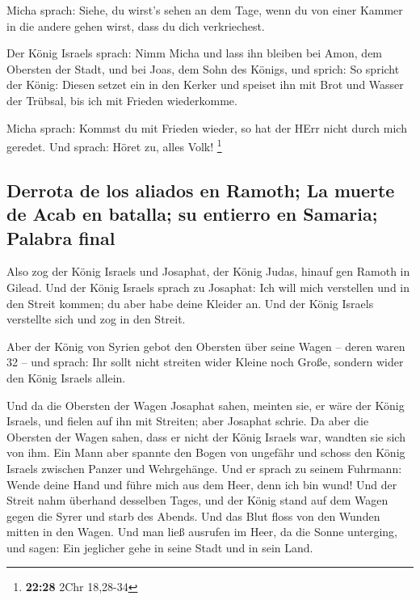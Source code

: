  Micha sprach: Siehe, du wirst's sehen an dem Tage, wenn
du von einer Kammer in die andere gehen wirst, dass du dich
verkriechest.

 Der König Israels sprach: Nimm Micha und lass ihn
bleiben bei Amon, dem Obersten der Stadt, und bei Joas, dem Sohn des
Königs,  und sprich: So spricht der König: Diesen setzet
ein in den Kerker und speiset ihn mit Brot und Wasser der Trübsal, bis
ich mit Frieden wiederkomme.

 Micha sprach: Kommst du mit Frieden wieder, so hat der
HErr nicht durch mich geredet. Und sprach: Höret zu, alles Volk!
\footnote{\textbf{22:28} 2Chr 18,28-34}

\hypertarget{derrota-de-los-aliados-en-ramoth-la-muerte-de-acab-en-batalla-su-entierro-en-samaria-palabra-final}{%
\subsection{Derrota de los aliados en Ramoth; La muerte de Acab en
batalla; su entierro en Samaria; Palabra
final}\label{derrota-de-los-aliados-en-ramoth-la-muerte-de-acab-en-batalla-su-entierro-en-samaria-palabra-final}}

 Also zog der König Israels und Josaphat, der König
Judas, hinauf gen Ramoth in Gilead.  Und der König
Israels sprach zu Josaphat: Ich will mich verstellen und in den Streit
kommen; du aber habe deine Kleider an. Und der König Israels verstellte
sich und zog in den Streit.

 Aber der König von Syrien gebot den Obersten über seine
Wagen -- deren waren 32 -- und sprach: Ihr sollt nicht streiten wider
Kleine noch Große, sondern wider den König Israels allein.

 Und da die Obersten der Wagen Josaphat sahen, meinten
sie, er wäre der König Israels, und fielen auf ihn mit Streiten; aber
Josaphat schrie.  Da aber die Obersten der Wagen sahen,
dass er nicht der König Israels war, wandten sie sich von ihm.
 Ein Mann aber spannte den Bogen von ungefähr und schoss
den König Israels zwischen Panzer und Wehrgehänge. Und er sprach zu
seinem Fuhrmann: Wende deine Hand und führe mich aus dem Heer, denn ich
bin wund!  Und der Streit nahm überhand desselben Tages,
und der König stand auf dem Wagen gegen die Syrer und starb des Abends.
Und das Blut floss von den Wunden mitten in den Wagen. 
Und man ließ ausrufen im Heer, da die Sonne unterging, und sagen: Ein
jeglicher gehe in seine Stadt und in sein Land.

